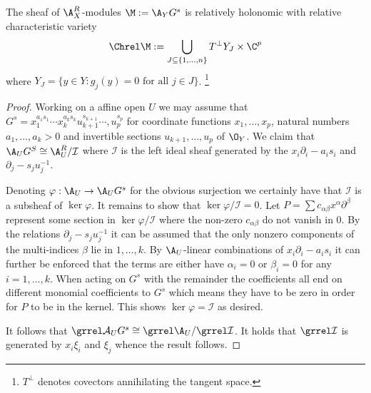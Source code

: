 \begin{lemma}\label{lem: RelHolGs}
  The sheaf of $\A_X^R$-modules $\M := \A_Y G^s$ is relatively holonomic with relative characteristic variety
  $$\Chrel \M := \bigcup_{J\subseteq \{1,\ldots, n\}} T^\perp Y_J \times \C^p $$
  where $Y_J = \{y\in Y: g_j(y) = 0  \text{ for all }j\in J \}$. \footnote{$T^\perp$ denotes covectors annihilating the tangent space. }
\end{lemma}
\begin{proof}
  Working on a affine open $U$ we may assume that $G^s=x_1^{a_1s_1}\cdots x_k^{a_k s_k} u_{k+1}^{s_{k+1}} \cdots, u_{p}^{s_p}$ for coordinate functions $x_1,\ldots, x_p$, natural numbers $a_1,\ldots, a_k>0$ and invertible sections $u_{k+1},\ldots,u_{p}$ of $\O_Y$.
  We claim that $\A_U G^S \cong \A_U^R/\mathcal{I}$ where $\mathcal{I}$ is the left ideal sheaf generated by the $x_i\partial_i - a_is_i$ and $\partial_{j} - s_{j}u_j^{-1}$.

  Denoting $\varphi:\A_U \to \A_U G^s$ for the obvious surjection we certainly have that $\mathcal{I}$ is a subsheaf of $\ker \varphi$.
  It remains to show that $\ker\varphi / \mathcal{I} = 0$.
  Let $P=\sum c_{\alpha \beta} x^\alpha \partial^\beta$ represent some section in $\ker \varphi/\mathcal{I}$ where the non-zero $c_{\alpha \beta}$ do not vanish in $0$.
  By the relations $\partial_{j} - s_{j}u_j^{-1}$ it can be assumed that the only nonzero components of the multi-indices $\beta$ lie in $1,\ldots, k$.
  By $\A_U$-linear combinations of $x_i \partial_i - a_is_i$ it can further be enforced that the terms are either have $\alpha_i = 0$ or $\beta_i = 0$ for any $i=1,\ldots, k$. When acting on $G^s$ with the remainder the coefficients all end on different monomial coefficients to $G^s$ which means they have to be zero in order for $P$ to be in the kernel. This shows $\ker\varphi = \mathcal{I}$ as desired.

  It follows that $\grrel \mathcal{A}_UG^s \cong \grrel\A_U /\grrel \mathcal{I}$. It holds that $\grrel \mathcal{I}$ is generated by $x_i \xi_i$ and $\xi_j$ whence the result follows.
\end{proof}

